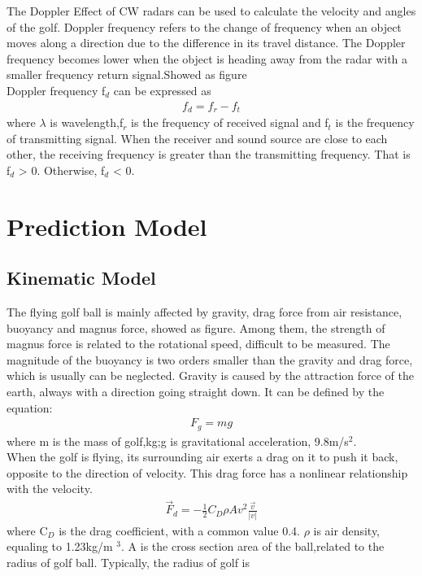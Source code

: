The Doppler Effect of CW radars can be used to calculate the velocity and angles of the golf. Doppler frequency refers to the change of frequency when an object moves along a direction due to the difference in its travel distance. The Doppler frequency becomes lower when the object is heading away from the radar with a smaller frequency return signal.Showed as figure\\
Doppler frequency f$_d$ can be expressed as
\begin{align}
    f_{d}=f_{r}-f_{t}
\end{align}
where $\lambda$ is wavelength,f$_r$ is the frequency of received signal and f$_t$ is the frequency of transmitting signal.
When the receiver and sound source are close to each other, the receiving frequency is greater than the transmitting frequency. That is f$_d$ > 0.
Otherwise, f$_d$ < 0.



\newpage
\section{Prediction Model}
\subsection{Kinematic Model}
The flying golf ball is mainly affected by gravity, drag force from air resistance, buoyancy and magnus force, showed as figure. Among them, the strength of magnus force is related to the rotational speed, difficult to be measured. The magnitude of the buoyancy is two orders smaller than the gravity and drag force, which is usually can be neglected.
Gravity is caused by the attraction force of the earth, always with a direction going straight down. It can be defined by the equation:
\begin{align}
F_{g}=m g
\end{align}
where m is the mass of golf,kg;g is gravitational acceleration, 9.8m/s$^2$.\\
When the golf is flying, its surrounding air exerts a drag on it to push it back, opposite to the direction of velocity. This drag force has a nonlinear relationship with the velocity.
\begin{align}
\vec{F}_{d}=-\frac{1}{2} C_{D} \rho A v^{2} \frac{\vec{v}}{|v|}
\end{align}
where C$_D$ is the drag coefficient, with a common value 0.4. $\rho$ is air density, equaling to 1.23kg/m $^3$. A is the cross section area of the ball,related to the radius of golf ball. Typically, the radius of golf is


